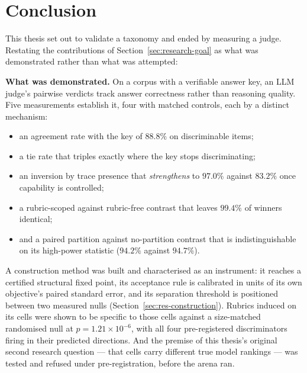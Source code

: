 
\section{Conclusion}\label{sec:conclusion}

This thesis set out to validate a taxonomy and ended by measuring a
judge. Restating the contributions of
Section~\ref{sec:research-goal} as what was demonstrated rather than
what was attempted:

\textbf{What was demonstrated.}
On a corpus with a verifiable answer key, an LLM judge's pairwise
verdicts track answer correctness rather than reasoning quality. Five
measurements establish it, four with matched controls, each by a
distinct mechanism:
\begin{itemize}
\item an agreement rate with the key of $88.8\%$ on discriminable
items;
\item a tie rate that triples exactly where the key stops
discriminating;
\item an inversion by trace presence that \emph{strengthens} to
$97.0\%$ against $83.2\%$ once capability is controlled;
\item a rubric-scoped against rubric-free contrast that leaves
$99.4\%$ of winners identical;
\item and a paired partition against no-partition contrast that is
indistinguishable on its high-power statistic ($94.2\%$ against
$94.7\%$).
\end{itemize}
A construction method was built and characterised as an instrument: it
reaches a certified structural fixed point, its acceptance rule is
calibrated in units of its own objective's paired standard error, and
its separation threshold is positioned between two measured nulls
(Section~\ref{sec:res-construction}).
Rubrics induced on its cells were shown to be specific to those cells
against a size-matched randomised null at
$p = 1.21 \times 10^{-6}$, with all four pre-registered discriminators
firing in their predicted directions.
And the premise of this thesis's original second research question ---
that cells carry different true model rankings --- was tested and
refused under pre-registration, before the arena ran.

